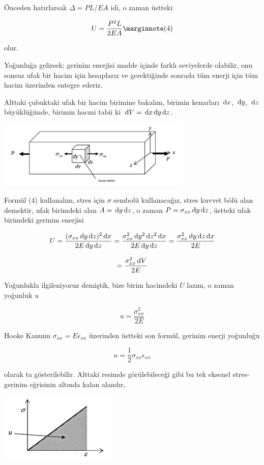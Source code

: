 \documentclass[12pt,fleqn]{article}\usepackage{../../common}
\begin{document}
Önceden hatırlarsak $\Delta = PL / EA$ idi, o zaman üstteki 

$$
U = \frac{P^2 L}{2 E A}
\mlabel{4}
$$

olur.

Yoğunluğa gelirsek; gerinim enerjisi madde içinde farklı seviyelerde olabilir,
onu sonsuz ufak bir hacim için hesaplarız ve gerektiğinde sonrada tüm enerji
için tüm hacim üzerinden entegre ederiz.

Alttaki çubuktaki ufak bir hacim birimine bakalım, birimin kenarları $\,\mathrm{d} x$,
$\,\mathrm{d} y$, $\,\mathrm{d} z$ büyüklüğünde, birimin hacmi tabii ki $\,\mathrm{d} V = \,\mathrm{d} x \,\mathrm{d} y \,\mathrm{d}
z$.

\includegraphics[width=25em]{phy_020_strs_00_06.jpg}

Formül (4) kullanalım, stres için $\sigma$ sembolü kullanacağız, stres kuvvet
bölü alan demektir, ufak birimdeki alan $A = \,\mathrm{d} y \,\mathrm{d} z$, o zaman
$P = \sigma_{xx} \,\mathrm{d} y \,\mathrm{d} z$, üstteki ufak birimdeki gerinim enerjisi

$$
U = \frac{(\sigma_{xx} \,\mathrm{d} y \,\mathrm{d} z)^2 \,\mathrm{d} x}{2 E \,\mathrm{d} y \,\mathrm{d} z} =
\frac{\sigma_{xx}^2 \,\mathrm{d} y^2 \,\mathrm{d} z^2 \,\mathrm{d} x}{2 E \,\mathrm{d} y \,\mathrm{d} z} =
\frac{\sigma_{xx}^2 \,\mathrm{d} y \,\mathrm{d} z \,\mathrm{d} x}{2 E} 
$$

$$
= \frac{\sigma_{xx}^2 \,\mathrm{d} V}{2 E} 
$$

Yoğunlukla ilgileniyoruz demiştik, bize birim hacimdeki $U$ lazım, o zaman
yoğunluk $u$

$$
u = \frac{\sigma_{xx}^2}{2 E}
$$

Hooke Kanunu $\sigma_{xx} = E \epsilon_{xx}$ üzerinden üstteki son formül,
gerinim enerji yoğunluğu

$$
u = \frac{1}{2} \sigma_{xx} \epsilon_{xx}
$$

olarak ta gösterilebilir. Alttaki resimde görülebileceği gibi bu tek eksenel
stres-gerinim eğrisinin altında kalan alandır,

\includegraphics[width=15em]{phy_020_strs_00_09.jpg}
\end{document}
